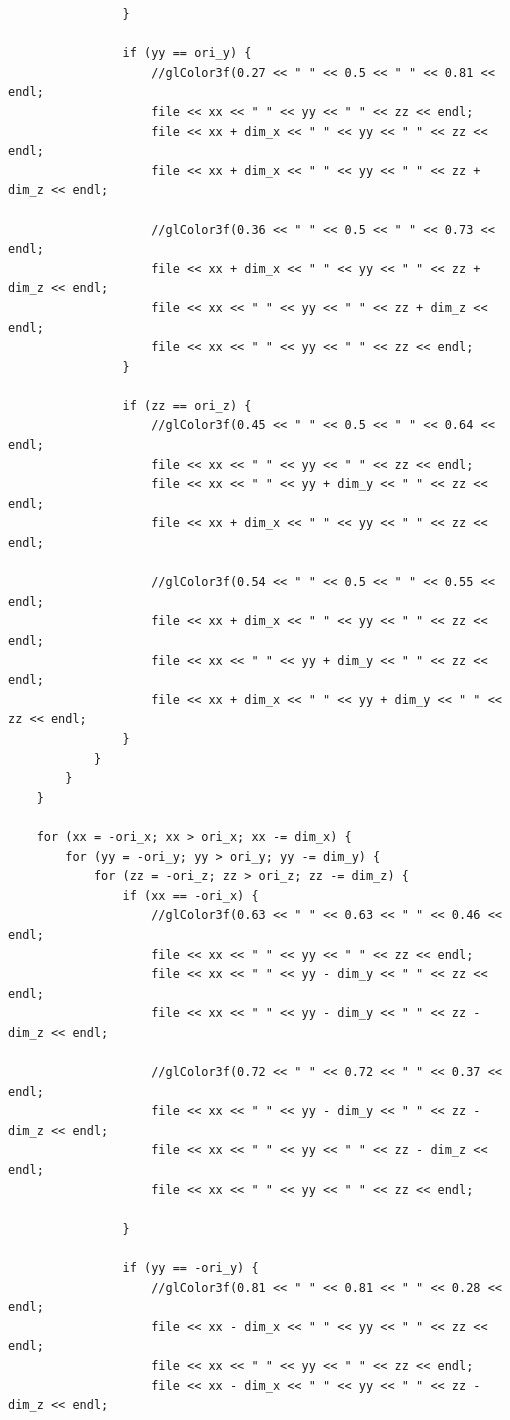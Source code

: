 \documentclass{report}
\begin{document}
\begin{lstlisting}
                }

                if (yy == ori_y) {
                    //glColor3f(0.27 << " " << 0.5 << " " << 0.81 << endl;
                    file << xx << " " << yy << " " << zz << endl;
                    file << xx + dim_x << " " << yy << " " << zz << endl;
                    file << xx + dim_x << " " << yy << " " << zz + dim_z << endl;

                    //glColor3f(0.36 << " " << 0.5 << " " << 0.73 << endl;
                    file << xx + dim_x << " " << yy << " " << zz + dim_z << endl;
                    file << xx << " " << yy << " " << zz + dim_z << endl;
                    file << xx << " " << yy << " " << zz << endl;
                }

                if (zz == ori_z) {
                    //glColor3f(0.45 << " " << 0.5 << " " << 0.64 << endl;
                    file << xx << " " << yy << " " << zz << endl;
                    file << xx << " " << yy + dim_y << " " << zz << endl;
                    file << xx + dim_x << " " << yy << " " << zz << endl;

                    //glColor3f(0.54 << " " << 0.5 << " " << 0.55 << endl;
                    file << xx + dim_x << " " << yy << " " << zz << endl;
                    file << xx << " " << yy + dim_y << " " << zz << endl;
                    file << xx + dim_x << " " << yy + dim_y << " " << zz << endl;
                }
            }
        }
    }

    for (xx = -ori_x; xx > ori_x; xx -= dim_x) {
        for (yy = -ori_y; yy > ori_y; yy -= dim_y) {
            for (zz = -ori_z; zz > ori_z; zz -= dim_z) {
                if (xx == -ori_x) {
                    //glColor3f(0.63 << " " << 0.63 << " " << 0.46 << endl;
                    file << xx << " " << yy << " " << zz << endl;
                    file << xx << " " << yy - dim_y << " " << zz << endl;
                    file << xx << " " << yy - dim_y << " " << zz - dim_z << endl;

                    //glColor3f(0.72 << " " << 0.72 << " " << 0.37 << endl;
                    file << xx << " " << yy - dim_y << " " << zz - dim_z << endl;
                    file << xx << " " << yy << " " << zz - dim_z << endl;
                    file << xx << " " << yy << " " << zz << endl;

                }

                if (yy == -ori_y) {
                    //glColor3f(0.81 << " " << 0.81 << " " << 0.28 << endl;
                    file << xx - dim_x << " " << yy << " " << zz << endl;
                    file << xx << " " << yy << " " << zz << endl;
                    file << xx - dim_x << " " << yy << " " << zz - dim_z << endl;


\end{lstlisting}
\end{document}
